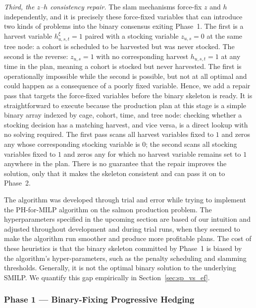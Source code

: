 \documentclass[12pt,a4paper]{article}
\begin{document}
\textit{Third, the $z$--$h$ consistency repair.} The slam mechanisms force-fix $z$
and $h$ independently, and it is precisely these force-fixed variables that can introduce
two kinds of problems into the binary consensus exiting Phase~1. The first is a
harvest variable $h^\xi_{u,s,t} = 1$ paired with a stocking variable $z_{u,s} = 0$ at
the same tree node: a cohort is scheduled to be harvested but was never stocked. The
second is the reverse: $z_{u,s} = 1$ with no corresponding harvest $h_{u,s,t} = 1$ at
any time in the plan, meaning a cohort is stocked but never harvested. The first is operationally impossible while the second is possible, but not at all optimal and could happen as a consequence of a poorly fixed variable. Hence, we add a repair pass that targets the force-fixed variables before the binary skeleton is ready. 
It is straightforward to execute
because the production plan at this stage is a simple binary array indexed by cage,
cohort, time, and tree node: checking whether a stocking decision has a matching
harvest, and vice versa, is a direct lookup with no solving required. The first pass
scans all harvest variables fixed to $1$ and zeros any whose corresponding stocking
variable is $0$; the second scans all stocking variables fixed to $1$ and zeros any for
which no harvest variable remains set to $1$ anywhere in the plan. 
There is no guarantee that the repair improves the solution, only that it makes the skeleton consistent and can pass it on to Phase~2.

The algorithm was developed through trial and error while trying to implement the PH-for-MILP algorithm on the salmon production problem. The hyperparameters specified in the upcoming section are based of our intuition and adjusted throughout development and during trial runs, when they seemed to make the algorithm run smoother and produce more profitable plans. The cost of these heuristics is that the binary skeleton committed by Phase~1 is biased by the algorithm's hyper-parameters, such as the penalty scheduling and
slamming thresholds. Generally, it is not the optimal binary solution to the underlying SMILP. We quantify this gap empirically in Section~\ref{sec:sp_vs_ef}.

\subsubsection{Phase 1 --- Binary-Fixing Progressive Hedging}
\label{sec:binaryph}
\end{document}
